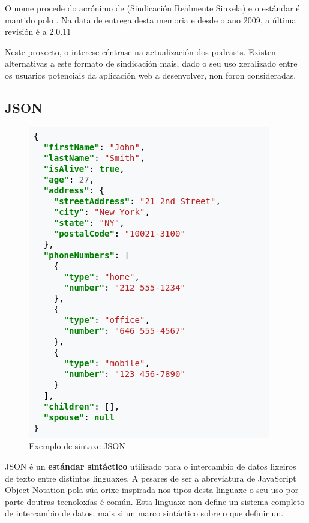 O nome procede do acrónimo de (Sindicación Realmente Sinxela) e o estándar é mantido polo . Na data de entrega desta memoria e desde o ano 2009, a última revisión é a 2.0.11 \cite{rss}

Neste proxecto, o interese céntrase na actualización dos podcasts. Existen alternativas a este formato de sindicación mais, dado o seu uso xeralizado entre os usuarios potenciais da aplicación web a desenvolver, non foron consideradas.


\subsection{JSON}

\begin{figure}[h]
	\centering
	\includegraphics[scale=0.5,keepaspectratio=true]{./images/json.png}
	\caption{Exemplo de sintaxe JSON\cite{json_wiki}}
	\label{fig:json}
\end{figure}

JSON é un \textbf{estándar sintáctico} utilizado para o intercambio de datos lixeiros de texto entre distintas linguaxes. A pesares de ser a abreviatura de JavaScript Object Notation pola súa orixe inspirada nos tipos desta linguaxe\cite{json} o seu uso por parte doutras tecnoloxías é común. Esta linguaxe non define un sistema completo de intercambio de datos, mais si un marco sintáctico sobre o que definir un.

